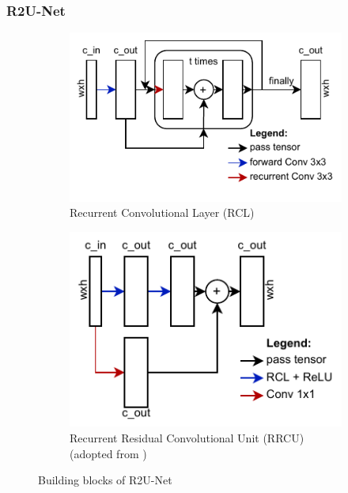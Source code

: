 \documentclass{article}
\begin{document}
\subsubsection{R2U-Net}
\begin{figure}
	\centering
	\begin{subfigure}[b]{0.53\textwidth}
		\includegraphics[width=\textwidth]{RCL}
		\caption{Recurrent Convolutional Layer (RCL)}
		\label{fig:rcl}
	\end{subfigure}
	\hfill
	\begin{subfigure}[b]{0.45\textwidth}
		\includegraphics[width=\textwidth]{RRCU}
		\caption{Recurrent Residual Convolutional Unit (RRCU) (adopted from 
			\autocite[4]{R2UNet})}
		\label{fig:rrcu}
	\end{subfigure}
	\caption{Building blocks of R2U-Net}
	\label{fig:r2blocks}
\end{figure}
\end{document}
